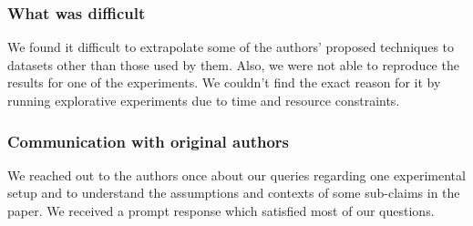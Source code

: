 {\subsubsection*{What was difficult}
We found it difficult to extrapolate some of the authors' proposed techniques to datasets other than those used by them.  Also, we were not able to reproduce the results for one of the experiments. We couldn't find the exact reason for it by running explorative experiments due to time and resource constraints.

\subsubsection*{Communication with original authors}
We reached out to the authors once about our queries regarding one experimental setup and to understand the assumptions and contexts of some sub-claims in the paper. We received a prompt response which satisfied most of our questions. 

}
\def \replicationCITE{}
\def \replicationBIB{}
\def \replicationURL{}
\def \replicationDOI{}
\def \contactNAME{}
\def \contactEMAIL{}
\def \articleKEYWORDS{rescience c, rescience x}
\def \journalNAME{ReScience C}
\def \journalVOLUME{9}
\def \journalISSUE{2}
\def \articleNUMBER{}
\def \articleDOI{}
\def \authorsFULL{Anonymous Authors}
\def \authorsABBRV{Anonymous}
\def \authorsSHORT{Anonymous}
\title{\articleTITLE}
\date{}
\author[1,\orcid{0000-0000-0000-0000}]{Anonymous}
